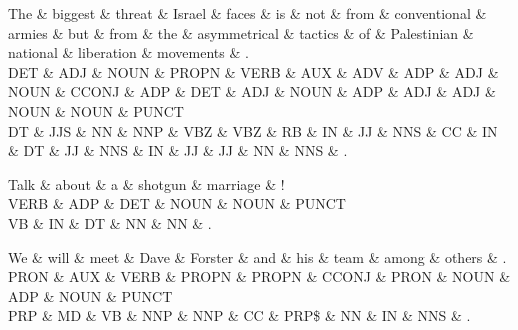 \begin{dependency}
\begin{deptext}
The \& biggest \& threat \& Israel \& faces \& is \& not \& from \& conventional \& armies \& but \& from \& the \& asymmetrical \& tactics \& of \& Palestinian \& national \& liberation \& movements \& . \\
DET \& ADJ \& NOUN \& PROPN \& VERB \& AUX \& ADV \& ADP \& ADJ \& NOUN \& CCONJ \& ADP \& DET \& ADJ \& NOUN \& ADP \& ADJ \& ADJ \& NOUN \& NOUN \& PUNCT \\
DT \& JJS \& NN \& NNP \& VBZ \& VBZ \& RB \& IN \& JJ \& NNS \& CC \& IN \& DT \& JJ \& NNS \& IN \& JJ \& JJ \& NN \& NNS \& . \\
\end{deptext}



\end{dependency}

\begin{dependency}
\begin{deptext}
Talk \& about \& a \& shotgun \& marriage \& ! \\
VERB \& ADP \& DET \& NOUN \& NOUN \& PUNCT \\
VB \& IN \& DT \& NN \& NN \& . \\
\end{deptext}



\end{dependency}

\begin{dependency}
\begin{deptext}
We \& will \& meet \& Dave \& Forster \& and \& his \& team \& among \& others \& . \\
PRON \& AUX \& VERB \& PROPN \& PROPN \& CCONJ \& PRON \& NOUN \& ADP \& NOUN \& PUNCT \\
PRP \& MD \& VB \& NNP \& NNP \& CC \& PRP\$ \& NN \& IN \& NNS \& . \\
\end{deptext}



\end{dependency}

